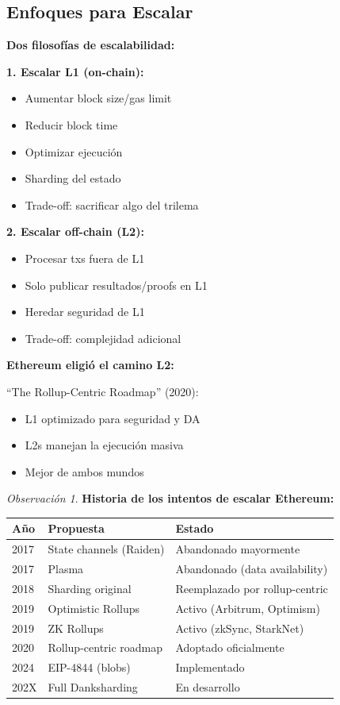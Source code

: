 \documentclass[11pt,a4paper,twoside,openright]{book}
\theoremstyle{definition}
\theoremstyle{plain}
\theoremstyle{remark}
\newtheorem{remark}{Observación}[chapter]
\begin{document}
\subsection{Enfoques para Escalar}

\begin{keyidea}
\textbf{Dos filosofías de escalabilidad:}

\textbf{1. Escalar L1 (on-chain):}
\begin{itemize}
    \item Aumentar block size/gas limit
    \item Reducir block time
    \item Optimizar ejecución
    \item Sharding del estado
    \item Trade-off: sacrificar algo del trilema
\end{itemize}

\textbf{2. Escalar off-chain (L2):}
\begin{itemize}
    \item Procesar txs fuera de L1
    \item Solo publicar resultados/proofs en L1
    \item Heredar seguridad de L1
    \item Trade-off: complejidad adicional
\end{itemize}

\textbf{Ethereum eligió el camino L2:}

``The Rollup-Centric Roadmap'' (2020):
\begin{itemize}
    \item L1 optimizado para seguridad y DA
    \item L2s manejan la ejecución masiva
    \item Mejor de ambos mundos
\end{itemize}
\end{keyidea}

\begin{remark}
\textbf{Historia de los intentos de escalar Ethereum:}

\begin{center}
\begin{tabular}{lll}
\toprule
\textbf{Año} & \textbf{Propuesta} & \textbf{Estado} \\
\midrule
2017 & State channels (Raiden) & Abandonado mayormente \\
2017 & Plasma & Abandonado (data availability) \\
2018 & Sharding original & Reemplazado por rollup-centric \\
2019 & Optimistic Rollups & Activo (Arbitrum, Optimism) \\
2019 & ZK Rollups & Activo (zkSync, StarkNet) \\
2020 & Rollup-centric roadmap & Adoptado oficialmente \\
2024 & EIP-4844 (blobs) & Implementado \\
202X & Full Danksharding & En desarrollo \\
\bottomrule
\end{tabular}
\end{center}
\end{remark}
\end{document}
